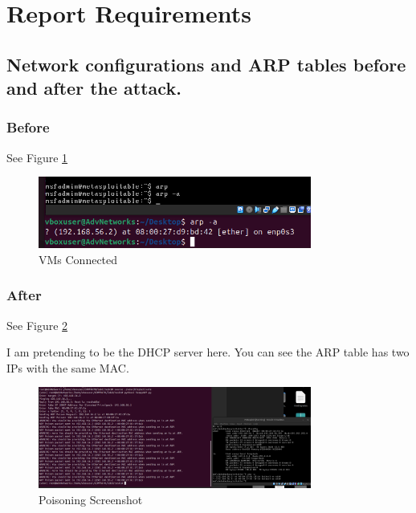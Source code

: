\documentclass{article}
\begin{document}
\label{subsubsec:arp-mit}

\section*{Report Requirements}

\subsection*{Network configurations and ARP tables before and after the attack.}

\subsubsection*{Before}

See Figure \ref{fig:before}

\begin{figure}[h]
    \centering
    \includegraphics[width=0.8\textwidth]{task1/screenshot/before.png}
    \caption{VMs Connected}
    \label{fig:before}
\end{figure}

\subsubsection*{After}

See Figure \ref{fig:after}

I am pretending to be the DHCP server here. You can see the ARP table has two IPs with the same MAC. 

\begin{figure}[h]
    \centering
    \includegraphics[width=0.8\textwidth]{task1/screenshot/poison.png}
    \caption{Poisoning Screenshot}
    \label{fig:after}
\end{figure}
\end{document}
